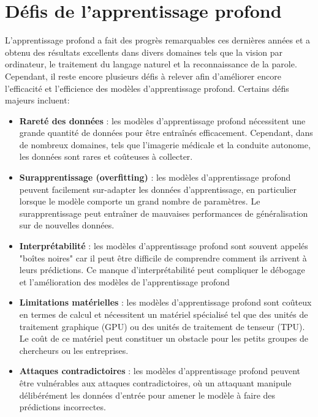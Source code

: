 \section{Défis de l'apprentissage profond}
L'apprentissage profond a fait des progrès remarquables ces dernières années et
a obtenu des résultats excellents dans divers domaines tels que la vision par
ordinateur, le traitement du langage naturel et la reconnaissance de la parole.
Cependant, il reste encore plusieurs défis à relever afin d'améliorer encore
l'efficacité et l'efficience des modèles d'apprentissage profond. Certains
défis majeurs incluent:
\begin{itemize}
	\item \textbf{Rareté des données} : les modèles d'apprentissage profond nécessitent une grande quantité de données pour être entraînés efficacement. Cependant, dans de nombreux domaines, tels que l'imagerie médicale et la conduite autonome, les données sont rares et coûteuses à collecter.

	\item \textbf{Surapprentissage (overfitting)} : les modèles d'apprentissage profond peuvent facilement sur-adapter les données d'apprentissage, en particulier lorsque le modèle comporte un grand nombre de paramètres. Le surapprentissage peut entraîner de mauvaises performances de généralisation sur de nouvelles données.

	\item \textbf{Interprétabilité} : les modèles d'apprentissage profond sont souvent appelés "boîtes noires" car il peut être difficile de comprendre comment ils arrivent à leurs prédictions. Ce manque d'interprétabilité peut compliquer le débogage et l'amélioration des modèles de l’apprentissage profond

	\item \textbf{Limitations matérielles} : les modèles d'apprentissage profond  sont coûteux en termes de calcul et nécessitent un matériel spécialisé tel que des unités de traitement graphique (GPU) ou des unités de traitement de tenseur (TPU). Le coût de ce matériel peut constituer un obstacle pour les petits groupes de chercheurs ou les entreprises.

	\item \textbf{Attaques contradictoires} : les modèles d'apprentissage profond  peuvent être vulnérables aux attaques contradictoires, où un attaquant manipule délibérément les données d'entrée pour amener le modèle à faire des prédictions incorrectes.

\end{itemize}

